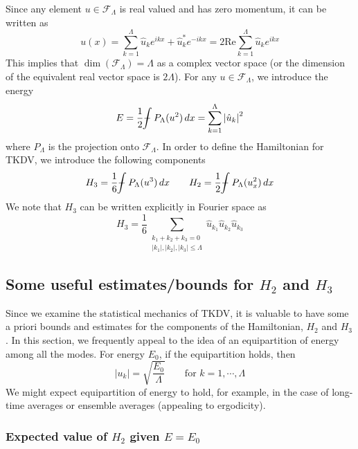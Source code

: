 \documentclass[12pt]{article}
\newcommand{\abs}[1]{\left| #1 \right|}
\newcommand{\uhat}{\hat{u}}
\newcommand{\Real}{\text{Re}}
\newcommand{\Fspace}{\mathscr{F}_{\Lambda}}
\newcommand{\Proj}{P_{\Lambda}}
\newcommand{\sumk}{\sum_{k=1}^{\Lambda}}
\def\Xint#1{\mathchoice
   {\XXint\displaystyle\textstyle{#1}}%
   {\XXint\textstyle\scriptstyle{#1}}%
   {\XXint\scriptstyle\scriptscriptstyle{#1}}%
   {\XXint\scriptscriptstyle\scriptscriptstyle{#1}}%
   \!\int}
\def\XXint#1#2#3{{\setbox0=\hbox{$#1{#2#3}{\int}$}
     \vcenter{\hbox{$#2#3$}}\kern-.5\wd0}}
\def\dashint{\Xint-}
\newcommand{\intt}{\dashint}%
\newcommand{\dx}{\, dx}
\begin{document}
Since any element $u \in \Fspace$ is real valued and has zero momentum, it can be written as
\begin{equation}
u(x) = \sumk \uhat_k e^{i k x} + \uhat_k^{*} e^{-i k x} 
= 2 \Real \sumk \uhat_k e^{i k x}
\end{equation}
This implies that $\dim(\Fspace) = \Lambda$ as a complex vector space (or the dimension of the equivalent real vector space is $2\Lambda$).
For any $u \in \Fspace$, we introduce the energy
\begin{equation}
E = \frac{1}{2} \intt \Proj(u^2) \dx = \sumk \abs{\uhat_k}^2
\end{equation}
where $\Proj$ is the projection onto $\Fspace$.
In order to define the Hamiltonian for TKDV, we introduce the following components
\begin{equation}
H_3 = \frac{1}{6} \intt \Proj(u^3) \dx \qquad H_2 = \frac{1}{2} \intt \Proj(u_x^2) \dx
\end{equation}
We note that $H_3$ can be written explicitly in Fourier space as \cite{abramov2003hamiltonian} 
\begin{equation}
\label{H3dirsum}
H_3 = \frac{1}{6} \sum_{\substack{ k_1 + k_2 + k_3 = 0 \\ \abs{k_1}, \abs{k_2}, \abs{k_3} \le \Lambda}}\uhat_{k_1} \uhat_{k_2} \uhat_{k_3}
\end{equation}

\subsection{Some useful estimates/bounds for $H_2$ and $H_3$}

Since we examine the statistical mechanics of TKDV, it is valuable to have some a priori bounds and estimates for the components of the Hamiltonian, $H_2$ and $H_3$. In this section, we frequently appeal to the idea of an equipartition of energy among all the modes. For energy $E_0$, if the equipartition holds, then
\begin{equation}
\abs{u_k} = \sqrt{\frac{E_0}{\Lambda}} \qquad \text{for } k=1,\cdots,\Lambda
\end{equation}
We might expect equipartition of energy to hold, for example, in the case of long-time averages or ensemble averages (appealing to ergodicity).

\subsubsection{Expected value of $H_2$ given $E=E_0$}
\end{document}

